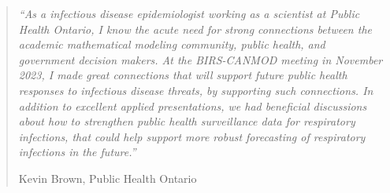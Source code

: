 \begin{quote}
\textit{``As a infectious disease epidemiologist working as a scientist at Public Health Ontario, I know the acute need for strong connections between the academic mathematical modeling community, public health, and government decision makers. At the BIRS-CANMOD meeting in November 2023, I made great connections that will support future public health responses to infectious disease threats, by supporting such connections. In addition to excellent applied presentations, we had beneficial discussions about how to strengthen public health surveillance data for respiratory infections, that could help support more robust forecasting of respiratory infections in the future.''}

\hfill Kevin Brown, Public Health Ontario
\end{quote}